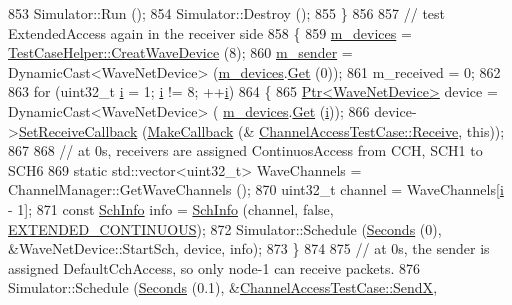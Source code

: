 \begin{DoxyCode}
853     Simulator::Run ();
854     Simulator::Destroy ();
855   \}
856 
857   \textcolor{comment}{// test ExtendedAccess again in the receiver side}
858   \{
859     \hyperlink{classChannelAccessTestCase_a36ad5644e4eb713b912aed42eb3fe4dc}{m\_devices} = \hyperlink{classTestCaseHelper_a24337801fa036883111fa1968606b57e}{TestCaseHelper::CreatWaveDevice} (8);
860     \hyperlink{classChannelAccessTestCase_af2ed348403976d1e39d0099313ed3680}{m\_sender} = DynamicCast<WaveNetDevice> (\hyperlink{classChannelAccessTestCase_a36ad5644e4eb713b912aed42eb3fe4dc}{m\_devices}.\hyperlink{classns3_1_1NetDeviceContainer_a677d62594b5c9d2dea155cc5045f4d0b}{Get} (0));
861     m\_received = 0;
862 
863     \textcolor{keywordflow}{for} (uint32\_t \hyperlink{bernuolliDistribution_8m_a6f6ccfcf58b31cb6412107d9d5281426}{i} = 1; \hyperlink{bernuolliDistribution_8m_a6f6ccfcf58b31cb6412107d9d5281426}{i} != 8; ++\hyperlink{bernuolliDistribution_8m_a6f6ccfcf58b31cb6412107d9d5281426}{i})
864       \{
865         \hyperlink{classns3_1_1Ptr}{Ptr<WaveNetDevice>} device = DynamicCast<WaveNetDevice> (
      \hyperlink{classChannelAccessTestCase_a36ad5644e4eb713b912aed42eb3fe4dc}{m\_devices}.\hyperlink{classns3_1_1NetDeviceContainer_a677d62594b5c9d2dea155cc5045f4d0b}{Get} (\hyperlink{bernuolliDistribution_8m_a6f6ccfcf58b31cb6412107d9d5281426}{i}));
866         device->\hyperlink{classns3_1_1WaveNetDevice_a98a6505182abba177a0ab348356301d8}{SetReceiveCallback} (\hyperlink{group__makecallbackmemptr_ga9376283685aa99d204048d6a4b7610a4}{MakeCallback} (&
      \hyperlink{classChannelAccessTestCase_ae5b3299c80154aa10c3775bfc4f8c0ab}{ChannelAccessTestCase::Receive}, \textcolor{keyword}{this}));
867 
868         \textcolor{comment}{// at 0s, receivers are assigned ContinuosAccess from CCH, SCH1 to SCH6}
869         \textcolor{keyword}{static} std::vector<uint32\_t> WaveChannels = ChannelManager::GetWaveChannels ();
870         uint32\_t channel = WaveChannels[\hyperlink{bernuolliDistribution_8m_a6f6ccfcf58b31cb6412107d9d5281426}{i} - 1];
871         \textcolor{keyword}{const} \hyperlink{structns3_1_1SchInfo}{SchInfo} info = \hyperlink{structns3_1_1SchInfo}{SchInfo} (channel, \textcolor{keyword}{false}, 
      \hyperlink{channel-scheduler_8h_a51fe3e802b9451e2893d55d591047fc1}{EXTENDED\_CONTINUOUS});
872         Simulator::Schedule (\hyperlink{group__timecivil_ga33c34b816f8ff6628e33d5c8e9713b9e}{Seconds} (0), &WaveNetDevice::StartSch, device, info);
873       \}
874 
875     \textcolor{comment}{// at 0s, the sender is assigned DefaultCchAccess, so only node-1 can receive packets.}
876     Simulator::Schedule (\hyperlink{group__timecivil_ga33c34b816f8ff6628e33d5c8e9713b9e}{Seconds} (0.1), &\hyperlink{classChannelAccessTestCase_a372d321c372c644c86ff355e94704eaf}{ChannelAccessTestCase::SendX}, \textcolor{keyword}{
}
\end{DoxyCode}
